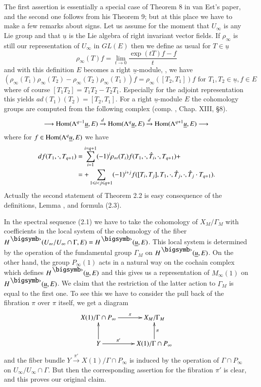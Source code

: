 The first assertion is essentially a special case of Theorem 8 in van Est's paper, and the second one follows from his Theorem 9; but at this place  we have to make a few remarks about signs. Let us assume for the moment that $U_\infty$ is any Lie group and that $\underline{u}$ is the Lie algebra of right invariant vector fields. If $\rho_\infty$ is still our representation of $U_\infty$ in $GL(E)$ then we define as usual for $T \in \underline{u}$
$$
\rho_\infty (T) f = \lim\limits_{t \to 0} \frac{\exp (t T)f -f}{t}
$$
and with this definition $E$ becomes a right $\underline{u}$-module, \ie, we have
$$
(\rho_\infty (T_1) \rho_\infty (T_2) - \rho_\infty (T_2) \rho_\infty (T_1) ) f = \rho_\infty ([T_2, T_1]) f \text{ for } T_1, T_2 \in \underline{u}, f \in E
$$
where of course $[T_1 T_2] = T_1 T_2 - T_2 T_1$. Especially for the adjoint representation this yields $ad (T_1) (T_2) = [T_2, T_1]$. For a right $\underline{u}$-module $E$ the cohomology groups are computed from the following complex (comp. \cite{art5-key3}, Chap. XIII, \S 8).
$$
\longrightarrow \operatorname{Hom} (\Lambda^{q-1} \underline{u}, E) \xrightarrow{d} \operatorname{Hom} (\Lambda^q \underline{u}, E)\xrightarrow{d} \operatorname{Hom} (\Lambda^{q+1} \underline{u}, E) \longrightarrow
$$
where for $f \in \operatorname{Hom} (\Lambda^q \underline{u}, E)$  we have
\setcounter{equation}{2}
\begin{align}
df (T_1 , \cdot , T_{q+1}) & = \sum\limits^{i=q+1}_{i=1} (-1)^i \rho_\infty (T_i)  f (T_1 , \cdot, \hat{T}_i, \cdot , T_{q+1}) + \notag\\
& = + \sum\limits_{1 \leqslant i < j \leqslant q +1} (-1)^{i+ j} f ([T_i, T_j], T_1 , \cdot , \hat{T}_j, \cdot , \hat{T}_j \cdot T_{q+1}). \label{art5-eq2.3}
\end{align}
Actually the second statement of Theorem 2.2 is easy consequence of the definitions, Lemma \label{art5-lem1.4}, and formula (2.3).

In the spectral sequence (2.1) we have to take the cohomology of $X_M/ \Gamma_M$ with coefficients in the local system of the cohomology of  the fiber\pageoriginale $H^\bigdot (U_\infty / U_\infty \cap \Gamma, E) = H^\bigdot (\underline{u}, E)$. This local system is determined by the operation of the fundamental group $\Gamma_M$ on $H^\bigdot (\underline{u}, E)$. On the other hand, the group $P_\infty (1)$ acts in a natural way on the cochain complex which defines $H^\bigdot (\underline{u}, E)$ and this gives us a representation of $M_\infty (1)$ on $H^\bigdot (\underline{u}, E)$. We claim that the restriction of the latter action to $\Gamma_M$ is equal to the first one. To see this we have to consider the pull back of the fibration $\pi$ over $\pi$ itself, we get a diagram 
$$
\xymatrix{
X(1)/ \Gamma \cap P_\infty \ar[r]^-\pi & X_M / \Gamma_M \\
Y\ar[r]^-{\pi'} \ar[u] & X(1) / \Gamma \cap P_\infty \ar[u]_-\pi
}
$$
and the fiber bundle $Y \xrightarrow{\pi'} X (1) / \Gamma \cap P_\infty$ is induced by the operation of $\Gamma \cap P_\infty$ on $U_\infty/ U_\infty \cap \Gamma$. But then the corresponding assertion for the fibration $\pi'$ is clear, and this proves our original claim. 

